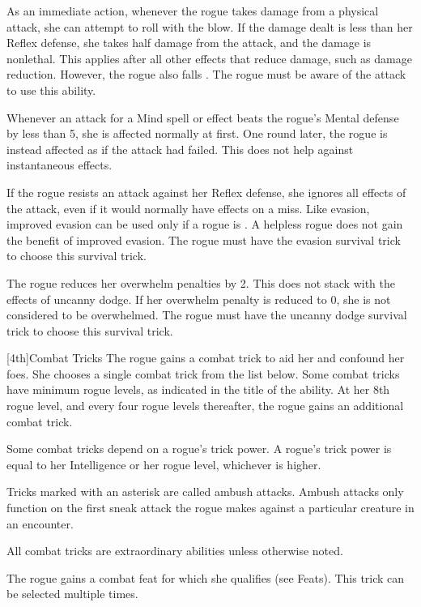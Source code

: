 As an immediate action, whenever the rogue takes damage from a physical attack, she can attempt to roll with the blow.
If the damage dealt is less than her Reflex defense, she takes half damage from the attack, and the damage is nonlethal.
This applies after all other effects that reduce damage, such as damage reduction.
However, the rogue also falls \prone.
The rogue must be aware of the attack to use this ability.

Whenever an attack for a Mind spell or effect beats the rogue's Mental defense by less than 5, she is affected normally at first.
One round later, the rogue is instead affected as if the attack had failed.
This does not help against instantaneous effects.

If the rogue resists an attack against her Reflex defense, she ignores all effects of the attack, even if it would normally have effects on a miss.
Like evasion, improved evasion can be used only if a rogue is \unencumbered.
A helpless rogue does not gain the benefit of improved evasion.
The rogue must have the evasion survival trick to choose this survival trick.

The rogue reduces her overwhelm penalties by 2.
This does not stack with the effects of uncanny dodge.
If her overwhelm penalty is reduced to 0, she is not considered to be overwhelmed.
The rogue must have the uncanny dodge survival trick to choose this survival trick.

[4th]{Combat Tricks}
The rogue gains a combat trick to aid her and confound her foes.
She chooses a single combat trick from the list below.
Some combat tricks have minimum rogue levels, as indicated in the title of the ability.
At her 8th rogue level, and every four rogue levels thereafter, the rogue gains an additional combat trick.

Some combat tricks depend on a rogue's trick power.
A rogue's trick power is equal to her Intelligence or her rogue level, whichever is higher.

Tricks marked with an asterisk are called ambush attacks.
Ambush attacks only function on the first sneak attack the rogue makes against a particular creature in an encounter.

All combat tricks are extraordinary abilities unless otherwise noted.

The rogue gains a combat feat for which she qualifies (see Feats).
This trick can be selected multiple times.

